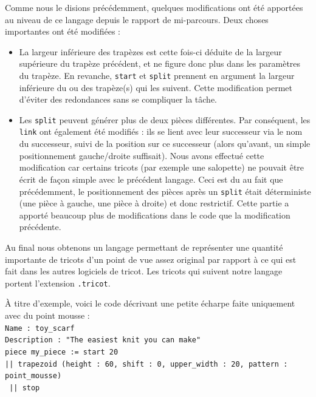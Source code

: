 \documentclass{article}
\begin{document}
Comme nous le disions précédemment, quelques modifications ont été
apportées au niveau de ce langage depuis le rapport de
mi-parcours. Deux choses importantes ont été modifiées :
\begin{itemize}
	\item La largeur inférieure des trapèzes est cette fois-ci
          déduite de la largeur supérieure du trapèze précédent, et ne figure
          donc plus dans les paramètres du trapèze. En revanche, \texttt{start}
          et \texttt{split} prennent en argument la largeur inférieure du ou
          des trapèze(s) qui les suivent. Cette modification
          permet d'éviter des redondances sans se compliquer la tâche.
	\item Les \texttt{split} peuvent générer plus de deux pièces
          différentes. Par conséquent, les \texttt{link} ont
          également été modifiés : ils se lient avec leur successeur
          via le nom du successeur, suivi de la position sur ce
          successeur (alors qu'avant, un simple positionnement
          gauche/droite suffisait). Nous avons effectué cette
          modification car certains tricots (par exemple une salopette)
          ne pouvait être écrit de façon simple avec le précédent
          langage. Ceci est du au fait que précédemment, le
          positionnement des pièces après un \texttt{split} était déterministe
          (une pièce à gauche, une pièce à droite) et donc
          restrictif. Cette partie a apporté beaucoup plus de
          modifications dans le code que la modification précédente.
\end{itemize}

Au final nous obtenons un langage permettant de représenter une quantité importante 
de tricots d'un point de vue assez original par rapport à ce qui est fait dans les 
autres logiciels de tricot. Les tricots qui suivent notre langage portent l'extension 
\texttt{.tricot}.

À titre d'exemple, voici le code décrivant une petite écharpe faite uniquement avec du 
point mousse :\\

\texttt{Name : toy\_scarf}\\
\texttt{Description : "The easiest knit you can make"}\\
\texttt{piece my\_piece := start 20 }\\
\texttt{|| trapezoid (height : 60, shift : 0, upper\_width : 20, pattern : point\_mousse)}\\
\texttt{ || stop} \\
\end{document}

